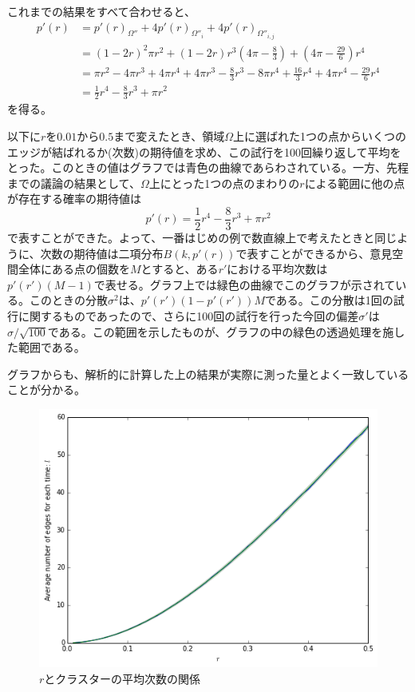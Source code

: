 これまでの結果をすべて合わせると、
\begin{align}
p'(r) &= p'(r)_{\Omega''} + 4p'(r)_{\Omega''_{i}} + 4p'(r)_{\Omega''_{i,j}}\nonumber \\
&= (1-2r)^{2}\pi r^{2} + (1-2r)r^{3}\left( 4\pi-\frac{8}{3} \right) + \left(4\pi -\frac{29}{6}\right)r^{4}\nonumber \\
&= \pi r^{2} - 4\pi r^{3} + 4\pi r^{4} + 4\pi r^{3} -\frac{8}{3}r^{3} - 8\pi r^{4} + \frac{16}{3}r^{4} + 4\pi r^{4} - \frac{29}{6}r^{4}\nonumber \\
&= \frac{1}{2}r^{4} -\frac{8}{3}r^{3} + \pi r^{2}
\end{align}
を得る。

以下に$r$を$0.01$から$0.5$まで変えたとき、領域$\Omega$上に選ばれた1つの点からいくつのエッジが結ばれるか(次数)の期待値を求め、この試行を100回繰り返して平均をとった。このときの値はグラフでは青色の曲線であらわされている。一方、先程までの議論の結果として、$\Omega$上にとった1つの点のまわりの$r$による範囲に他の点が存在する確率の期待値は
$$p'(r) = \frac{1}{2}r^{4} -\frac{8}{3}r^{3} + \pi r^{2}$$
で表すことができた。よって、一番はじめの例で数直線上で考えたときと同じように、次数の期待値は二項分布$B(k,p'(r))$で表すことができるから、意見空間全体にある点の個数を$M$とすると、ある$r'$における平均次数は$p'(r')(M-1)$で表せる。グラフ上では緑色の曲線でこのグラフが示されている。このときの分散$\sigma^{2}$は、$p'(r')(1-p'(r'))M$である。この分散は1回の試行に関するものであったので、さらに100回の試行を行った今回の偏差$\sigma'$は$\sigma/\sqrt{100}$である。この範囲を示したものが、グラフの中の緑色の透過処理を施した範囲である。

グラフからも、解析的に計算した上の結果が実際に測った量とよく一致していることが分かる。
\begin{figure}[H]
    \begin{center}
        \includegraphics[width=12.5cm]{../img/r_l.png}
        \caption{$r$とクラスターの平均次数の関係}
        \label{fig:f23}
    \end{center}
\end{figure}
